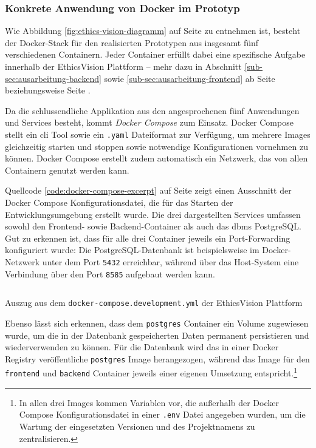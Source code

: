 \documentclass[a4paper,12pt,twoside]{scrreprt}
\begin{document}
\subsubsection*{Konkrete Anwendung von Docker im Prototyp}
\label{anwendung-docker}

Wie Abbildung \ref{fig:ethics-vision-diagramm} auf Seite \pageref{fig:ethics-vision-diagramm} zu entnehmen ist, besteht der Docker-Stack für den realisierten Prototypen aus insgesamt fünf verschiedenen Containern. Jeder Container erfüllt dabei eine spezifische Aufgabe innerhalb der EthicsVision Plattform -- mehr dazu in Abschnitt \ref{sub-sec:ausarbeitung-backend} sowie \ref{sub-sec:ausarbeitung-frontend} ab Seite \pageref{sub-sec:ausarbeitung-backend} beziehungsweise Seite \pageref{sub-sec:ausarbeitung-frontend}.

\medskip

Da die schlussendliche Applikation aus den angesprochenen fünf Anwendungen und Services besteht, kommt \textit{Docker Compose} zum Einsatz. Docker Compose stellt ein \ac{cli} Tool sowie ein \texttt{.yaml} Dateiformat zur Verfügung, um mehrere Images gleichzeitig starten und stoppen sowie notwendige Konfigurationen vornehmen zu können. Docker Compose erstellt zudem automatisch ein Netzwerk, das von allen Containern genutzt werden kann. \cite{montemagno_docker_2023, docker_inc_networking_compose_2023}

Quellcode \ref{code:docker-compose-excerpt} auf Seite \pageref{code:docker-compose-excerpt} zeigt einen Ausschnitt der Docker Compose Konfigurationsdatei, die für das Starten der Entwicklungsumgebung erstellt wurde. Die drei dargestellten Services umfassen sowohl den Frontend- sowie Backend-Container als auch das \ac{dbms} PostgreSQL. Gut zu erkennen ist, dass für alle drei Container jeweils ein Port-Forwarding konfiguriert wurde: Die PostgreSQL-Datenbank ist beispielsweise im Docker-Netzwerk unter dem Port \texttt{5432} erreichbar, während über das Host-System eine Verbindung über den Port \texttt{8585} aufgebaut werden kann. 

\begin{listing}[ht]
    \inputminted[fontsize=\footnotesize,linenos,xleftmargin=8mm]{yaml}{code/Luidold_Docker-Compose.yml}
    \caption{Auszug aus dem \texttt{docker-compose.development.yml} der EthicsVision Plattform}
    \label{code:docker-compose-excerpt}
\end{listing}

Ebenso lässt sich erkennen, dass dem \texttt{postgres} Container ein Volume zugewiesen wurde, um die in der Datenbank gespeicherten Daten permanent persistieren und wiederverwenden zu können. Für die Datenbank wird das in einer Docker Registry veröffentliche \texttt{postgres} Image herangezogen, während das Image für den \texttt{frontend} und \texttt{backend} Container jeweils einer eigenen Umsetzung entspricht.\footnote{In allen drei Images kommen Variablen vor, die außerhalb der Docker Compose Konfigurationsdatei in einer \texttt{.env} Datei angegeben wurden, um die Wartung der eingesetzten Versionen und des Projektnamens zu zentralisieren.}
\end{document}
